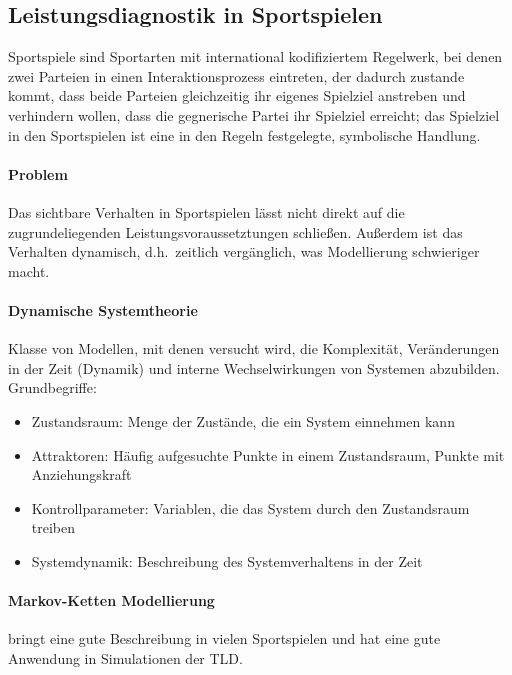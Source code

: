 \subsection{Leistungsdiagnostik in Sportspielen}
Sportspiele sind Sportarten mit international kodifiziertem Regelwerk, bei denen zwei Parteien in einen Interaktionsprozess eintreten, der dadurch zustande kommt, dass beide Parteien gleichzeitig ihr eigenes Spielziel anstreben und verhindern wollen, dass die gegnerische Partei ihr Spielziel erreicht; das Spielziel in den Sportspielen ist eine in den Regeln festgelegte, symbolische Handlung.
\paragraph{Problem} Das sichtbare Verhalten in Sportspielen lässt nicht direkt auf die zugrundeliegenden Leistungsvoraussetztungen schließen.
Außerdem ist das Verhalten dynamisch, d.h.\ zeitlich vergänglich, was Modellierung schwieriger macht.
\paragraph{Dynamische Systemtheorie} Klasse von Modellen, mit denen versucht wird, die Komplexität, Veränderungen in der Zeit (Dynamik) und interne Wechselwirkungen von Systemen abzubilden.\\
Grundbegriffe:\\
\begin{itemize}
  \item Zustandsraum: Menge der Zustände, die ein System einnehmen kann
  \item Attraktoren: Häufig aufgesuchte Punkte in einem Zustandsraum, Punkte mit Anziehungskraft
  \item Kontrollparameter: Variablen, die das System durch den Zustandsraum treiben
  \item Systemdynamik: Beschreibung des Systemverhaltens in der Zeit
\end{itemize}
\paragraph{Markov-Ketten Modellierung} bringt eine gute Beschreibung in vielen Sportspielen und hat eine gute Anwendung in Simulationen der TLD.\@
